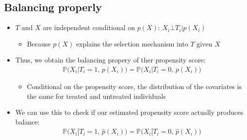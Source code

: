 \documentclass[10pt]{article}
\begin{document}
\subsection{Balancing properly}
\begin{itemize}
    \item $T\text{ and } X $ are independent conditional on $p(X):\, X_i\bot T_i|p(X_i) $
    \begin{itemize}
        \item Because $p(X) $ explains the selection mechanism into $T \text{ given } X $
    \end{itemize}
    \item Thus, we obtain the balancing propery of ther propensity score: 
    \begin{gather*}
        \mathbb{P}\big(X_i|T_i = 1,\, p(X_i)\big) = \mathbb{P}\big(X_i|T_i = 0,\, p(X_i)\big) 
    \end{gather*}
    \begin{itemize}
        \item Conditional on the propensity score, the distribution of the covariates is the same for treated and untreated individuals
    \end{itemize}
    \item We can use this to check if our estimated propensity score actually produces balance:
    \begin{gather*}
        \mathbb{P}\big(X_i|T_i = 1,\, \hat{p}(X_i)\big) = \mathbb{P}\big(X_i|T_i = 0,\, \hat{p}(X_i)\big) 
    \end{gather*} 
\end{itemize}
\end{document}
